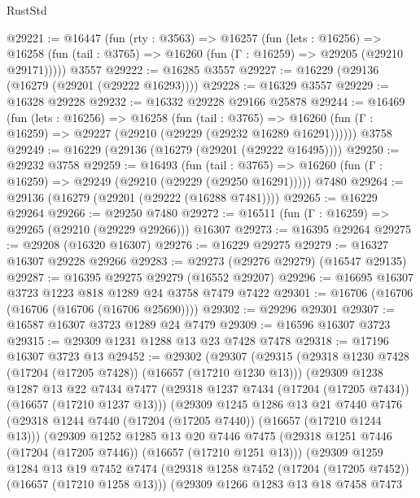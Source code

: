 \begin{lexlean}{RustStd}
\begin{coremodule}
@29221 := @16447
    (fun (rty : @3563) =>
    @16257
      (fun (lets : @16256) =>
      @16258 (fun (tail : @3765) => @16260 (fun (Γ : @16259) => @29205 (@29210 @29171)))))
    @3557
@29222 := @16285 @3557
@29227 := @16229 (@29136 (@16279 (@29201 (@29222 @16293))))
@29228 := @16329 @3557
@29229 := @16328 @29228
@29232 := @16332 @29228 @29166 @25878
@29244 := @16469
    (fun (lets : @16256) =>
    @16258
      (fun (tail : @3765) =>
      @16260 (fun (Γ : @16259) => @29227 (@29210 (@29229 (@29232 @16289 @16291))))))
    @3758
@29249 := @16229 (@29136 (@16279 (@29201 (@29222 @16495))))
@29250 := @29232 @3758
@29259 := @16493
    (fun (tail : @3765) => @16260 (fun (Γ : @16259) => @29249 (@29210 (@29229 (@29250 @16291)))))
    @7480
@29264 := @29136 (@16279 (@29201 (@29222 (@16288 @7481))))
@29265 := @16229 @29264
@29266 := @29250 @7480
@29272 := @16511 (fun (Γ : @16259) => @29265 (@29210 (@29229 @29266))) @16307
@29273 := @16395 @29264
@29275 := @29208 (@16320 @16307)
@29276 := @16229 @29275
@29279 := @16327 @16307 @29228 @29266
@29283 := @29273 (@29276 @29279) (@16547 @29135)
@29287 := @16395 @29275 @29279 (@16552 @29207)
@29296 := @16695 @16307 @3723 @1223 @818 @1289 @24 @3758 @7479 @7422
@29301 := @16706 (@16706 (@16706 (@16706 (@16706 @25690))))
@29302 := @29296 @29301
@29307 := @16587 @16307 @3723 @1289 @24 @7479
@29309 := @16596 @16307 @3723
@29315 := @29309 @1231 @1288 @13 @23 @7428 @7478
@29318 := @17196 @16307 @3723 @13
@29452 := @29302
    (@29307
      (@29315
        (@29318 @1230 @7428 (@17204 (@17205 @7428)) (@16657 (@17210 @1230 @13)))
        (@29309
          @1238
          @1287
          @13
          @22
          @7434
          @7477
          (@29318 @1237 @7434 (@17204 (@17205 @7434)) (@16657 (@17210 @1237 @13)))
          (@29309
            @1245
            @1286
            @13
            @21
            @7440
            @7476
            (@29318 @1244 @7440 (@17204 (@17205 @7440)) (@16657 (@17210 @1244 @13)))
            (@29309
              @1252
              @1285
              @13
              @20
              @7446
              @7475
              (@29318 @1251 @7446 (@17204 (@17205 @7446)) (@16657 (@17210 @1251 @13)))
              (@29309
                @1259
                @1284
                @13
                @19
                @7452
                @7474
                (@29318 @1258 @7452 (@17204 (@17205 @7452)) (@16657 (@17210 @1258 @13)))
                (@29309
                  @1266
                  @1283
                  @13
                  @18
                  @7458
                  @7473

\end{coremodule}
\end{lexlean}

